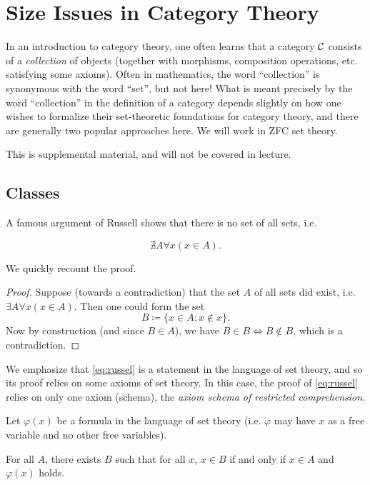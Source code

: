 \chapter{Size Issues in Category Theory}
\label{appendix:size issues}

In an introduction to category theory, one often learns that a category $\mathcal{C}$ consists of a \emph{collection} of objects (together with morphisms, composition operations, etc. satisfying some axioms). Often in mathematics, the word ``collection'' is synonymous with the word ``set'', but not here! What is meant precisely by the word ``collection'' in the definition of a category depends slightly on how one wishes to formalize their set-theoretic foundations for category theory, and there are generally two popular approaches here. We will work in ZFC set theory.

\begin{disclaimer}{}
    This is supplemental material, and will not be covered in lecture.
\end{disclaimer}

\section{Classes}

A famous argument of Russell shows that there is no set of all sets, i.e.

\begin{equation}\label{eq:russel}
    \nexists A \forall x (x \in A).
\end{equation}

We quickly recount the proof.

\begin{proof}
    Suppose (towards a contradiction) that the set $A$ of all sets did exist, i.e. $\exists A \forall x (x \in A)$. Then one could form the set
    \[B \coloneq \{x \in A : x \notin x\}.\]
    Now by construction (and since $B \in A$), we have $B \in B \iff B \notin B$, which is a contradiction.
\end{proof}

We emphasize that \eqref{eq:russel} is a statement in the language of set theory, and so its proof relies on some axioms of set theory. In this case, the proof of \eqref{eq:russel} relies on only one axiom (schema), the \emph{axiom schema of restricted comprehension}.

\begin{axiom}\label{ax:appendix:size issues:restricted comprehension}
    Let $\varphi(x)$ be a formula in the language of set theory (i.e. $\varphi$ may have $x$ as a free variable and no other free variables).

    For all $A$, there exists $B$ such that for all $x$, $x \in B$ if and only if $x \in A$ and $\varphi(x)$ holds.
\end{axiom}

